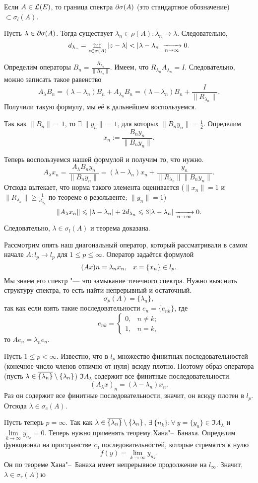 \begin{The}
  Если $A\in\mathcal L(E)$, то граница спектра $\partial \sigma(A)$ (это стандартное обозначение) $\subset \sigma_l(A)$.
\end{The}
\begin{Proof}
  Пусть $\lambda\in\partial \sigma(A)$. Тогда существует $\lambda_n\in\rho(A)\colon \lambda_n\to \lambda$. Следовательно, 
\[
  d_{\lambda_n} = \inf\limits_{z\in\sigma(A)} |z-\lambda| < |\lambda-\lambda_n|\xrightarrow[n\rightarrow\infty]{}0.
\]

Определим операторы $B_n = \frac{R_{\lambda_n}}{\|R_{\lambda_n}\|}$. Имеем, что $R_{\lambda_n} A_{\lambda_n} = I$. Следовательно, можно записать такое равенство
\[
  A_\lambda B_n = (\lambda-\lambda_n) B_n + A_{\lambda_n} B_n = 
  (\lambda-\lambda_n)B_n + \frac I{\|R_{\lambda_n}\|}.
\]
Получили такую формулу, мы её в дальнейшем воспользуемся.

Так как $\|B_n\|=1$, то $\exists\ \|y_n\|=1$, для которых $\|B_ny_n\| = \frac12$. Определим
\[
  x_n := \frac{B_ny_n}{\|B_ny_n\|}.
\]

Теперь воспользуемся нашей формулой и получим то, что нужно.
\[
  A_{\lambda}x_n = \frac{A_{\lambda}B_ny_n}{\|B_ny_n\|} = 
  (\lambda-\lambda_n) x_n + \frac{y_n}{\|R_{\lambda_n}\|\|B_ny_n\|}.
\]
Отсюда вытекает, что норма такого элемента оценивается ($\|x_n\|=1$ и $\|R_{\lambda_n}\|\ge\frac1{d_{\lambda_n}}$ по теореме о резольвенте; $\|y_n\|=1$)
\[
  \|A_\lambda x_n\|\leqslant |\lambda-\lambda_n| + 2 d_{\lambda_n} \leqslant 3|\lambda-\lambda_n|\xrightarrow[n\rightarrow\infty]{}0.
\]
Следовательно, $\lambda\in\sigma_l(A)$ и теорема доказана.
\end{Proof}

Рассмотрим опять наш диагональный оператор, который рассматривали в самом начале $A\colon l_p\to l_p$ для $1\le p\le \infty$. Оператор задаётся формулой
\[
  (Ax)n = \lambda_n x_n,\pau x= \{x_n\}\in l_p.
\]
Мы знаем его спектр "--- это замыкание точечного спектра. Нужно выяснить структуру спектра, то есть найти непрерывный и остаточный.
\[
  \sigma_p(A) = \{\lambda_n\},
\]
так как если взять такие последовательности $e_n = \{e_{nk}\}$, где 
\[
e_{nk} = \begin{cases}
  0,&n\ne k;\\
  1,&n=k,
\end{cases}
\]
то $Ae_n = \lambda_ne_n$.

Пусть $1\le p<\infty$. Известно, что в $l_p$ множество финитных последовательностей (конечное число членов отлично от нуля) всюду плотно. Поэтому образ оператора (пусть $\lambda\in\overline{\{\lambda_n\}}\setminus\{\lambda_n\}$) $\Im A_\lambda$ содержит все финитные последовательности.
\[
(  A_\lambda x)_n = (\lambda-\lambda_n) x_n.
\]
Раз он содержит все финитные последовательности, значит, он всюду плотен в $l_p$. Отсюда $\lambda\in \sigma_c(A)$.

Пусть теперь $p=\infty$. Так как $\lambda\in\overline{\{\lambda_n\}}\setminus\{\lambda_n\}$, $\exists\ \{n_k\}\colon \forall\ y=\{y_n\}\in \Im A_\lambda$ и $\lim\limits_{k\to\infty} y_{n_k} = 0$.
Теперь нужно применять теорему Хана"--~Банаха. Определим функционал на пространстве $c_0$ последовательностей, которые стремятся к нулю
\[
  f(y) = \lim\limits_{k\to \infty} y_{n_k}.
\]
Он по теореме Хана"--~Банаха имеет непрерывное продолжение на $l_{\infty}$. Значит, $\lambda\in\sigma_r(A)$ю
